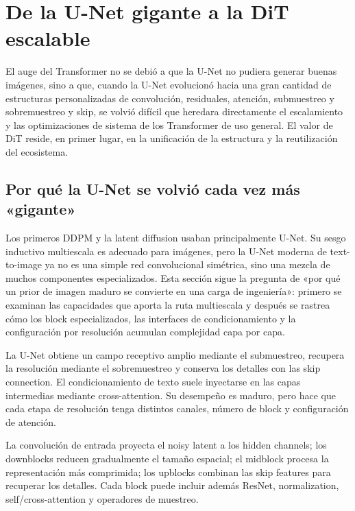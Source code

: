 \section{De la U-Net gigante a la DiT escalable}

El auge del Transformer no se debió a que la U-Net no pudiera generar buenas imágenes, sino a que, cuando la U-Net evolucionó hacia una gran cantidad de estructuras personalizadas de convolución, residuales, atención, submuestreo y sobremuestreo y skip, se volvió difícil que heredara directamente el escalamiento y las optimizaciones de sistema de los Transformer de uso general. El valor de DiT reside, en primer lugar, en la unificación de la estructura y la reutilización del ecosistema.

\subsection{Por qué la U-Net se volvió cada vez más «gigante»}

Los primeros DDPM y la latent diffusion usaban principalmente U-Net. Su sesgo inductivo multiescala es adecuado para imágenes, pero la U-Net moderna de text-to-image ya no es una simple red convolucional simétrica, sino una mezcla de muchos componentes especializados. Esta sección sigue la pregunta de «por qué un prior de imagen maduro se convierte en una carga de ingeniería»: primero se examinan las capacidades que aporta la ruta multiescala y después se rastrea cómo los block especializados, las interfaces de condicionamiento y la configuración por resolución acumulan complejidad capa por capa.


La U-Net obtiene un campo receptivo amplio mediante el submuestreo, recupera la resolución mediante el sobremuestreo y conserva los detalles con las skip connection. El condicionamiento de texto suele inyectarse en las capas intermedias mediante cross-attention. Su desempeño es maduro, pero hace que cada etapa de resolución tenga distintos canales, número de block y configuración de atención.


La convolución de entrada proyecta el noisy latent a los hidden channels; los downblocks reducen gradualmente el tamaño espacial; el midblock procesa la representación más comprimida; los upblocks combinan las skip features para recuperar los detalles. Cada block puede incluir además ResNet, normalization, self/cross-attention y operadores de muestreo.

